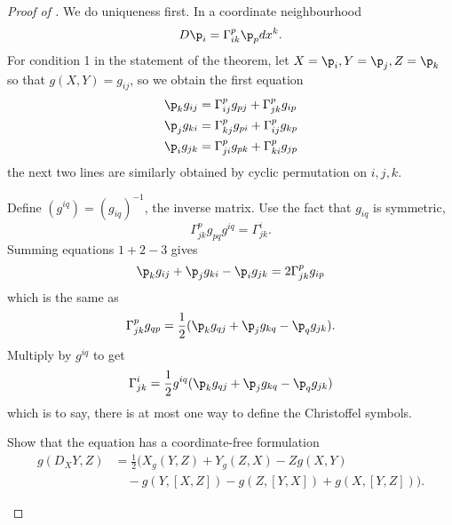 \documentclass[a4paper]{article}
\begin{document}
\begin{proof}[Proof of ]
  We do uniqueness first. In a coordinate neighbourhood
  \[
    D \p_i = \Gamma_{ik}^p \p_p dx^k.
  \]
  For condition 1 in the statement of the theorem, let \(X = \p_i, Y = \p_j, Z = \p_k\) so that \(g(X, Y) = g_{ij}\), so we obtain the first equation
  \begin{align*}
    \p_k g_{ij} &= \Gamma_{ij}^p g_{pj} + \Gamma_{jk}^p g_{ip} \\
    \p_j g_{ki} &= \Gamma_{kj}^p g_{pi} + \Gamma_{ij}^p g_{kp} \\
    \p_i g_{jk} &= \Gamma_{ji}^p g_{pk} + \Gamma_{ki}^p g_{jp}
  \end{align*}
  the next two lines are similarly obtained by cyclic permutation on \(i, j, k\).

  Define \((g^{iq}) = (g_{iq})^{-1}\), the inverse matrix. Use the fact that \(g_{iq}\) is symmetric,
  \[
    \Gamma_{jk}^p g_{pq} g^{iq} = \Gamma_{jk}^i.
  \]
  Summing equations \(1 + 2 - 3\) gives
  \[
    \p_k g_{ij} + \p_j g_{ki} - \p_i g_{jk}
    = 2\Gamma_{jk}^p g_{ip}
  \]
  which is the same as
  \[
    \Gamma_{jk}^p g_{qp} = \frac{1}{2} (\p_k g_{qj} + \p_j g_{kq} - \p_q g_{jk}).
  \]
  Multiply by \(g^{iq}\) to get
  \[
    \Gamma_{jk}^i = \frac{1}{2} g^{iq}(\p_k g_{qj} + \p_j g_{kq} - \p_q g_{jk})
  \]
  which is to say, there is at most one way to define the Christoffel symbols.

  \begin{ex}
    Show that the equation has a coordinate-free formulation
    \begin{align*}
      g(D_XY, Z) &= \frac{1}{2}(X_g(Y, Z) + Y_g(Z, X) - Zg(X, Y) \\
      &\quad - g(Y, [X, Z]) - g(Z, [Y, X]) + g(X, [Y, Z])).
    \end{align*}
  \end{ex}


\end{proof}
\end{document}
